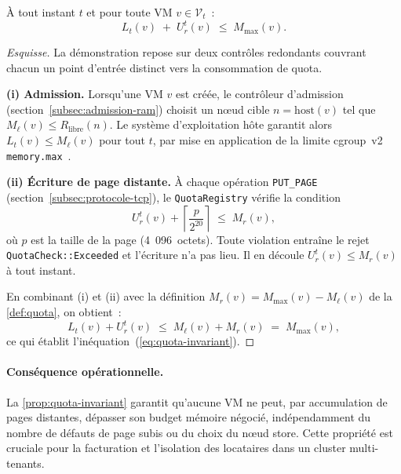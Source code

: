 \begin{proposition}
\label{prop:quota-invariant}
À tout instant $t$ et pour toute VM $v \in \mathcal{V}_t$~:
\begin{equation}
    \label{eq:quota-invariant}
    L_t(v) \;+\; U_r^t(v) \;\leq\; M_{\max}(v).
\end{equation}
\end{proposition}

\begin{proof}[Esquisse]
La démonstration repose sur deux contrôles redondants couvrant chacun un point d'entrée distinct vers la consommation de quota.

\textbf{(i) Admission.} Lorsqu'une VM $v$ est créée, le contrôleur d'admission (section~\ref{subsec:admission-ram}) choisit un nœud cible $n = \mathrm{host}(v)$ tel que $M_{\ell}(v) \leq R_{\text{libre}}(n)$. Le système d'exploitation hôte garantit alors $L_t(v) \leq M_{\ell}(v)$ pour tout $t$, par mise en application de la limite cgroup~v2 \texttt{memory.max}~\cite{cgroups_v2_doc}.

\textbf{(ii) Écriture de page distante.} À chaque opération \texttt{PUT\_PAGE} (section~\ref{subsec:protocole-tcp}), le \texttt{QuotaRegistry} vérifie la condition
\begin{equation}
    \label{eq:check-put}
    U_r^t(v) + \left\lceil \frac{p}{2^{20}} \right\rceil \;\leq\; M_r(v),
\end{equation}
où $p$ est la taille de la page (4~096~octets). Toute violation entraîne le rejet \texttt{QuotaCheck::Exceeded} et l'écriture n'a pas lieu. Il en découle $U_r^t(v) \leq M_r(v)$ à tout instant.

En combinant (i) et (ii) avec la définition $M_r(v) = M_{\max}(v) - M_{\ell}(v)$ de la \autoref{def:quota}, on obtient~:
\[
    L_t(v) + U_r^t(v) \;\leq\; M_{\ell}(v) + M_r(v) \;=\; M_{\max}(v),
\]
ce qui établit l'inéquation~(\ref{eq:quota-invariant}). \qedhere
\end{proof}

\paragraph{Conséquence opérationnelle.}
La \autoref{prop:quota-invariant} garantit qu'aucune VM ne peut, par accumulation de pages distantes, dépasser son budget mémoire négocié, indépendamment du nombre de défauts de page subis ou du choix du nœud store. Cette propriété est cruciale pour la facturation et l'isolation des locataires dans un cluster multi-tenants.

